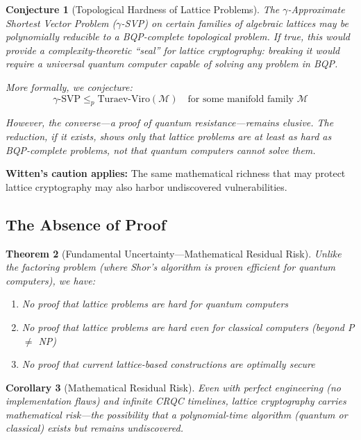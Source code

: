 \documentclass[11pt,a4paper]{article}
\newtheorem{theorem}{Theorem}[section]
\newtheorem{corollary}[theorem]{Corollary}
\newtheorem{conjecture}[theorem]{Conjecture}
\begin{document}
\begin{conjecture}[Topological Hardness of Lattice Problems]
The $\gamma$-Approximate Shortest Vector Problem ($\gamma$-SVP) on certain families of algebraic lattices may be polynomially reducible to a BQP-complete topological problem. If true, this would provide a complexity-theoretic ``seal'' for lattice cryptography: breaking it would require a universal quantum computer capable of solving any problem in BQP.

More formally, we conjecture:
\begin{equation}
\gamma\text{-SVP} \leq_p \text{Turaev-Viro}(\mathcal{M}) \quad \text{for some manifold family } \mathcal{M}
\end{equation}

However, the converse---a proof of quantum resistance---remains elusive. The reduction, if it exists, shows only that lattice problems are \textit{at least as hard as} BQP-complete problems, not that quantum computers cannot solve them.
\end{conjecture}

\textbf{Witten's caution applies:} The same mathematical richness that may protect lattice cryptography may also harbor undiscovered vulnerabilities.

\subsection{The Absence of Proof}

\begin{theorem}[Fundamental Uncertainty---Mathematical Residual Risk]
Unlike the factoring problem (where Shor's algorithm is proven efficient for quantum computers), we have:
\begin{enumerate}[noitemsep]
    \item No proof that lattice problems are hard for quantum computers
    \item No proof that lattice problems are hard even for classical computers (beyond P $\neq$ NP)
    \item No proof that current lattice-based constructions are optimally secure
\end{enumerate}
\end{theorem}

\begin{corollary}[Mathematical Residual Risk]
Even with perfect engineering (no implementation flaws) and infinite CRQC timelines, lattice cryptography carries \textit{mathematical risk}---the possibility that a polynomial-time algorithm (quantum or classical) exists but remains undiscovered.
\end{corollary}
\end{document}
